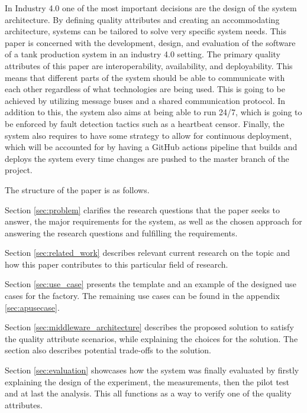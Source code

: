 
In Industry 4.0 one of the most important decisions are the design of the system architecture. By defining quality attributes and creating an accommodating architecture, systems can be tailored to solve very specific system needs. This paper is concerned with the development, design, and evaluation of the software of a tank production system in an industry 4.0 setting. The primary quality attributes of this paper are interoperability, availability, and deployability. This means that different parts of the system should be able to communicate with each other regardless of what technologies are being used. This is going to be achieved by utilizing message buses and a shared communication protocol. In addition to this, the system also aims at being able to run 24/7, which is going to be enforced by fault detection tactics such as a heartbeat censor. Finally, the system also requires to have some strategy to allow for continuous deployment, which will be accounted for by having a GitHub actions pipeline that builds and deploys the system every time changes are pushed to the master branch of the project.    


The structure of the paper is as follows. 

Section \ref{sec:problem} clarifies the research questions that the paper seeks to answer, the major requirements for the system, as well as the chosen approach for answering the research questions and fulfilling the requirements.

Section \ref{sec:related_work} describes relevant current research on the topic and how this paper contributes to this particular field of research.

Section \ref{sec:use_case} presents the template and an example of the designed use cases for the factory. The remaining use cases can be found in the appendix \ref{sec:apusecase}.  

Section \ref{sec:middleware_architecture} describes the proposed solution to satisfy the quality attribute scenarios, while explaining the choices for the solution. The section also describes potential trade-offs to the solution.  

Section \ref{sec:evaluation} showcases how the system was finally evaluated by firstly explaining the design of the experiment, the measurements, then the pilot test and at last the analysis. This all functions as a way to verify one of the quality attributes. 
